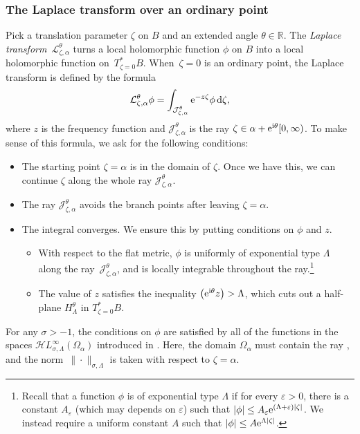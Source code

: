 \documentclass[10pt,a4paper]{amsart}
\let\Re\relax
\DeclareMathOperator{\Re}{Re}
\newcommand{\singexp}[2]{\mathcal{H}L^\infty_{#1, #2}}
\newcommand{\R}{\mathbb{R}}
\newcommand{\laplace}{\mathcal{L}}
\numberwithin{equation}{section}
\begin{document}
\subsubsection{The Laplace transform over an ordinary point}\label{laplace:ordinary}
%
Pick a translation parameter $\zeta$ on $B$ and an extended angle $\theta \in \R$. The {\em Laplace transform}~$\laplace_{\zeta, \alpha}^\theta$ turns a local holomorphic function $\phi$ on $B$ into a local holomorphic function on~$T^*_{\zeta = 0} B$. When~${\zeta = 0}$ is an ordinary point, the Laplace transform is defined by the formula
\begin{equation}\label{laplace:int}
\laplace_{\zeta, \alpha}^\theta \phi = \int_{\mathcal{J}_{\zeta, \alpha}^\theta} {\rm e}^{-z\zeta} \phi \,{\rm d}\zeta,
\end{equation}
where $z$ is the frequency function and $\mathcal{J}_{\zeta, \alpha}^\theta$ is the ray $\zeta \in \alpha + {\rm e}^{{\rm i}\theta} [0, \infty)$. To make sense of this formula, we ask for the following conditions:
\begin{itemize}\itemsep=0pt
\item The starting point $\zeta = \alpha$ is in the domain of $\zeta$. Once we have this, we can continue $\zeta$ along the whole ray $\mathcal{J}_{\zeta, \alpha}^\theta$.
\item The ray $\mathcal{J}_{\zeta, \alpha}^\theta$ avoids the branch points after leaving $\zeta = \alpha$.
\item The integral converges. We ensure this by putting conditions on $\phi$ and $z$.
\begin{itemize}\itemsep=0pt
\item With respect to the flat metric, $\phi$ is uniformly of exponential type $\Lambda$ along the ray~$\mathcal{J}_{\zeta, \alpha}^\theta$, and is locally integrable throughout the ray.\footnote{Recall that a function $\phi$ is of exponential type $\Lambda$ if for every $\varepsilon>0$, there is a constant $A_\varepsilon$ (which may depends on $\varepsilon$) such that $|\phi|\le A_\varepsilon {\rm e}^{(\Lambda+\varepsilon)|\zeta|}$. We instead require a uniform constant $A$ such that $|\phi| \le A {\rm e}^{\Lambda|\zeta|}$.}
\item The value of $z$ satisfies the inequality $\Re\bigl({\rm e}^{{\rm i}\theta} z\bigr) > \Lambda$, which cuts out a half-plane $H^\theta_\Lambda$ in $T^*_{\zeta = 0} B$.
\end{itemize}
\end{itemize}
For any $\sigma > -1$, the conditions on $\phi$ are satisfied by all of the functions in the spaces $\singexp{\sigma}{\Lambda}(\Omega_\alpha)$ introduced in \cite[Definition~2.3]{reg-sing-volterra}. Here, the domain $\Omega_\alpha$ must contain the ray , and the norm~$\|\cdot\|_{\sigma, \Lambda}$ is taken with respect to $\zeta = \alpha$.
\end{document}
